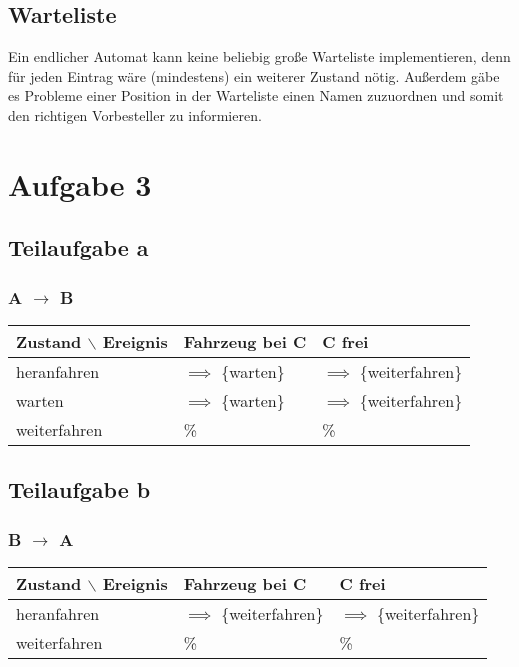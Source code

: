 \documentclass[koma,a4paper,10pt]{scrartcl}
\begin{document}
\subsection{Warteliste}
\label{sec-3-1}
Ein endlicher Automat kann keine beliebig große Warteliste implementieren, denn für jeden Eintrag wäre (mindestens) ein weiterer Zustand nötig. Außerdem gäbe es Probleme einer Position in der Warteliste einen Namen zuzuordnen und somit den richtigen Vorbesteller zu informieren.
\section{Aufgabe 3}
\label{sec-4}
\subsection{Teilaufgabe a}
\label{sec-4-1}
\subsubsection{A $\to$ B}
\label{sec-4-1-1}
\begin{center}
\begin{tabular}{lll}
Zustand $\backslash$ Ereignis & Fahrzeug bei C & C frei\\
\hline
heranfahren & $\implies$ \{warten\} & $\implies$ \{weiterfahren\}\\
warten & $\implies$ \{warten\} & $\implies$ \{weiterfahren\}\\
weiterfahren & \% & \%\\
\end{tabular}
\end{center}
\subsection{Teilaufgabe b}
\label{sec-4-2}
\subsubsection{B $\to$ A}
\label{sec-4-2-1}
\begin{center}
\begin{tabular}{lll}
Zustand $\backslash$ Ereignis & Fahrzeug bei C & C frei\\
\hline
heranfahren & $\implies$ \{weiterfahren\} & $\implies$ \{weiterfahren\}\\
weiterfahren & \% & \%\\
\end{tabular}
\end{center}
\end{document}
